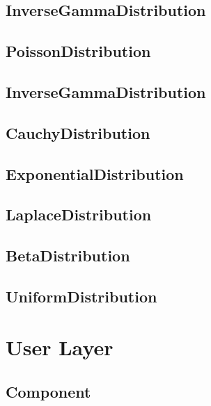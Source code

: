\documentclass[draftspec]{ninemlspec}
\begin{document}
\subsection{InverseGammaDistribution}
\label{sec:InverseGammaDistribution}

\subsection{PoissonDistribution}
\label{sec:PoissonDistribution}

\subsection{InverseGammaDistribution}
\label{sec:InverseGammaDistribution}

\subsection{CauchyDistribution}
\label{sec:CauchyDistribution}

\subsection{ExponentialDistribution}
\label{sec:ExponentialDistribution}

\subsection{LaplaceDistribution}
\label{sec:LaplaceDistribution}

\subsection{BetaDistribution}
\label{sec:BetaDistribution}

\subsection{UniformDistribution}
\label{sec:UniformDistribution}


\newpage

\section{User Layer}
\label{UserL}

\subsection{Component}
\label{sec:Component}
\end{document}
